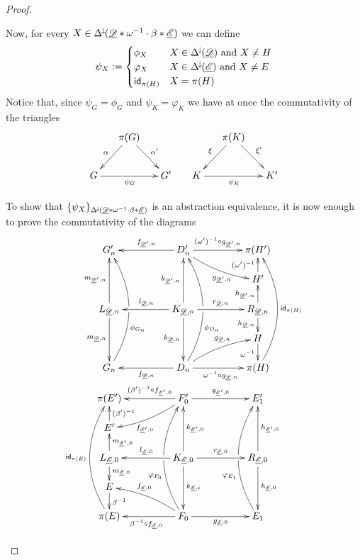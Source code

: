 \begin{proof}
\begin{itemize}
Now, for every $X\in \Delta^{\hspace{-1pt}\downarrow\hspace{-1pt}}(\underline{\mathscr{D}}*\omega^{-1}\cdot \beta*\underline{\mathscr{E}})$ we can define
\[\psi_X:=\begin{cases}
	\phi_X & X\in  \Delta^{\hspace{-1pt}\downarrow\hspace{-1pt}}(\underline{\mathscr{D}})\text{ and } X\neq H\\\varphi_X & X\in  \Delta^{\hspace{-1pt}\downarrow\hspace{-1pt}}(\underline{\mathscr{E}}) \text{ and } X\neq E\\\mathsf{id}_{\pi(H)}& X=\pi(H)\end{cases}\]
Notice that, since $\psi_G=\phi_G$ and $\psi_K=\varphi_K$ we have at once  the commutativity of the triangles
\[\xymatrix@C=15pt{&\pi(G) \ar[dr]^{\alpha'} \ar[dl]_{\alpha}&&& \pi(K) \ar[dr]^{\xi'} \ar[dl]_{\xi}\\ G\ar[rr]_{\psi_G} && G' &K \ar[rr]_{\psi_K} && K' } \]


To show that $\{\psi_X\}_{\Delta^{\hspace{-1pt}\downarrow\hspace{-1pt}}(\underline{\mathscr{D}}*\omega^{-1}\cdot \beta*\underline{\mathscr{E}})}$ is an abstraction equivalence, it is now enough to prove the commutativity of the diagrams
	\[\xymatrix@C=45pt@R=15pt{G'_n&D'_n \ar[r]^-{(\omega')^{-1}\circ g_{\der{D}',n}} \ar@/_.2cm/[dr]_(.6){g_{\der{D}',n}} \ar[l]_{f_{\der{D}',n}}&\pi(H') \\&&H' \ar[u]^{(\omega')^{-1}}\\  L_{\der{D}, n} \ar[uu]^{m_{\der{D}',n}} \ar[dd]_{m_{\der{D},n}}& K_{\der{D}, n} \ar[uu]^{k_{\der{D}',n}} \ar[dd]_{k_{\der{D},n}} \ar[r]^{r_{\der{D},n}} \ar[l]_{l_{\der{D},n}} &R_{\der{D}, n}\ar[u]^{h_{\der{D}',n}} \ar[d]_{h_{\der{D},n}}\\&&H \ar[d]_{\omega^{-1}}\\G_n \ar@/_.7cm/[uuuu]_(.35){\phi_{G_n}}|\hole&D_n\ar[l]^{f_{\der{D},n}}\ar@/_.7cm/[uuuu]_(.35){\phi_{D_n}}|\hole \ar@/^.2cm/[ur]^(.6){g_{\der{D},n}}\ar[r]_{\omega^{-1}\circ g_{\der{D},n}}&\pi(H)\ar@/_.7cm/[uuuu]_{\id{\pi(H)}}\\ \pi(E')&F'_0 \ar[l]_-{(\beta')^{-1}\circ f_{\der{E}',0}} \ar@/^.2cm/[dl]^(.6){f_{\der{E}',0}} \ar[r]^{g_{\der{E}',0}}&E'_1 \\E' \ar[u]_{(\beta')^{-1}}&& \\  L_{\der{E}, 0} \ar[u]_{m_{\der{E}', 0}} \ar[d]^{m_{\der{E}, 0}}& K_{\der{E}, 0} \ar[uu]_{k_{\der{E}', 0}} \ar[dd]^{k_{\der{E}, i}} \ar[r]^{r_{\der{E},0}} \ar[l]_{l_{\der{E},0}} &R_{\der{E}, 0}\ar[uu]_{h_{\der{E}',0}} \ar[dd]^{h_{\der{E},0}}\\E \ar[d]^{\beta^{-1}}&& \\\pi(E) \ar@/^.7cm/[uuuu]^{\id{\pi(E)}}&F_0\ar[l]^{\beta^{-1}\circ f_{\der{E},0}}\ar@/^.7cm/[uuuu]^(.35){\varphi_{F_0}}|\hole \ar@/_.2cm/[ul]_(.6){f_{\der{E},0}}\ar[r]_{g_{\der{E},0}}&E_1\ar@/^.7cm/[uuuu]^(.35){\varphi_{E_1}}|\hole}\]
		

\end{itemize}
\end{proof}
